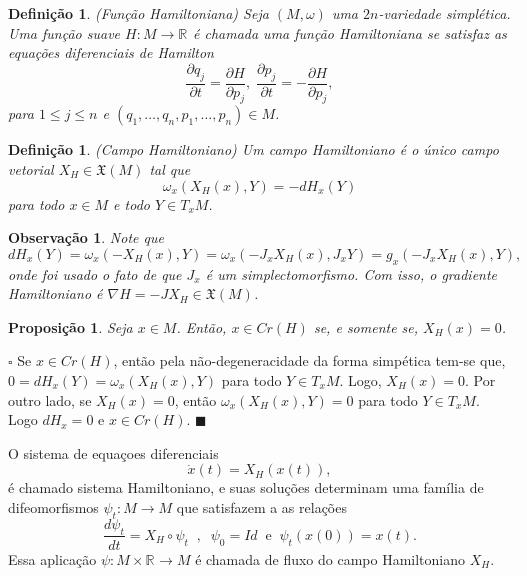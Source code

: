 \documentclass[12pt]{book}
\newtheorem{definicao}[teorema]{Definição}
\newtheorem{observacao}[teorema]{Observação}
\newtheorem{proposicao}[teorema]{Proposição}
\newenvironment{prova}[1]{$\square$ #1}{\hfill$\blacksquare$}
\newcommand{\campohamiltoniano}[1]{X_{H}(#1)}
\newcommand{\campohamiltonianoabrev}{X_{H}}
\newcommand{\campossuaves}[1]{\mathfrak{X}(#1)}
\newcommand{\derivada}[2]{\frac{d #1}{d #2}}
\newcommand{\espacotangenteponto}[2]{T_{#1}#2}
\newcommand{\pontoscriticos}[1]{\textit{Cr}(#1)}
\newcommand{\real}[1]{\mathbb{R}^{#1}}
\newcommand{\reta}{\real{}}
\begin{document}
	\begin{definicao}
		(Função Hamiltoniana) Seja $(M, \omega)$ uma $2n$-variedade simplética. Uma função suave $H : M \to \real{}$ é chamada uma função Hamiltoniana se satisfaz as equações diferenciais de Hamilton
		$$
		\frac{\partial q_{j}}{\partial t} = \frac{\partial H}{\partial p_{j}}, \; \frac{\partial p_{j}}{\partial t} = -\frac{\partial H}{\partial p_{j}},
		$$
		para $1\leq j \leq n$ e $(q_{1}, \dots, q_{n}, p_{1}, \dots, p_{n}) \in M$.
	\end{definicao}
	
	\begin{definicao}
		(Campo Hamiltoniano) Um campo Hamiltoniano é o único campo vetorial $X_{H}\in \campossuaves{M}$ tal que
		$$
		\omega_{x}(X_{H}(x), Y) = -dH_{x}(Y)
		$$
		para todo $x\in M$ e todo $Y \in \espacotangenteponto{x}{M}$.
	\end{definicao}
	
	\begin{observacao}
		Note que 
		$$
		dH_{x}(Y)=\omega_{x}(-X_{H}(x), Y) =\omega_{x}(-J_{x}X_{H}(x), J_{x}Y) =g_{x}(-J_{x}X_{H}(x), Y),$$
		onde foi usado o fato de que $J_{x}$ é um simplectomorfismo. Com isso, o gradiente Hamiltoniano é $\nabla H = -JX_{H} \in \campossuaves{M}$.
	\end{observacao}
	
	\begin{proposicao}
		Seja $x\in M$. Então, $x\in \pontoscriticos{H}$ se, e somente se, $\campohamiltoniano{x}=0$.
	\end{proposicao}
	\begin{prova}
		Se $x\in \pontoscriticos{H}$, então pela não-degeneracidade da forma simpética tem-se que, $0=dH_{x}(Y)=\omega_{x}(\campohamiltonianoabrev(x), Y)$ para todo $Y\in T_{x}M$. Logo, $\campohamiltoniano{x} =0$. Por outro lado, se $\campohamiltoniano{x} =0$, então $\omega_{x}(\campohamiltonianoabrev(x), Y)=0$ para todo $Y\in T_{x}M$. Logo $dH_{x}=0$ e $x\in \pontoscriticos{H}$.
	\end{prova}
	
	O sistema de equaçoes diferenciais
	$$
		\dot{x}(t)=\campohamiltoniano{x(t)},
	$$
	é chamado sistema Hamiltoniano, e suas soluções determinam uma família de difeomorfismos $\psi_{t}:M\to M$ que satisfazem a as relações 
	$$
	\derivada{\psi_{t}}{t}=\campohamiltonianoabrev\circ\psi_{t} \;\;, \;\; \psi_{0}=Id \;\;\text{e}\;\;  \psi_{t}(x(0)) = x(t).
	$$
	Essa aplicação $\psi: M\times \reta \to M$ é chamada de fluxo do campo Hamiltoniano $\campohamiltonianoabrev$.
	
\end{document}
